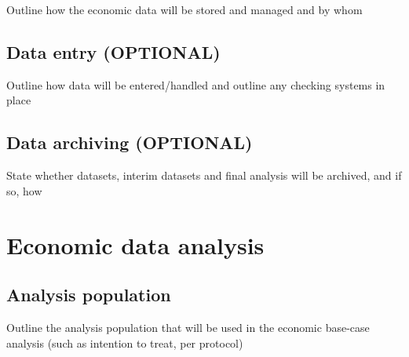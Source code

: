 Outline how the economic data will be stored and managed and by whom



\subsection{Data entry (OPTIONAL)}

Outline how data will be entered/handled and outline any checking systems in place



\subsection{Data archiving (OPTIONAL)}

State whether datasets, interim datasets and final analysis will be archived, and if so, how





\section{Economic data analysis}


\subsection{Analysis population}

Outline the analysis population that will be used in the economic
base-case analysis (such as intention to treat, per protocol)



